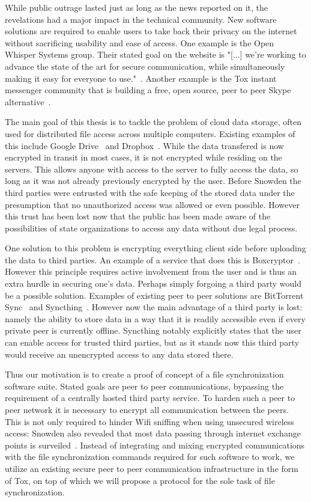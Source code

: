While public outrage lasted just as long as the news reported on it, the revelations had a major impact in the technical community.
New software solutions are required to enable users to take back their privacy on the internet without sacrificing usability and ease of access.
One example is the Open Whisper Systems group.
Their stated goal on the website is "[...] we're working to advance the state of the art for secure communication, while simultaneously making it easy for everyone to use."~\cite{web:site:whispersystems}.
Another example is the Tox instant messenger community that is building a free, open source, peer to peer Skype alternative~\cite{web:site:tox}.

The main goal of this thesis is to tackle the problem of cloud data storage, often used for distributed file access across multiple computers.
Existing examples of this include Google Drive~\cite{web:site:gdrive} and Dropbox~\cite{web:site:dropbox}.
While the data transfered is now encrypted in transit in most cases, it is not encrypted while residing on the servers.
This allows anyone with access to the server to fully access the data, so long as it was not already previously encrypted by the user.
Before Snowden the third parties were entrusted with the safe keeping of the stored data under the presumption that no unauthorized access was allowed or even possible.
However this trust has been lost now that the public has been made aware of the possibilities of state organizations to access any data without due legal process.

One solution to this problem is encrypting everything client side before uploading the data to third parties.
An example of a service that does this is Boxcryptor~\cite{web:site:boxcryptor}.
However this principle requires active involvement from the user and is thus an extra hurdle in securing one's data.
Perhaps simply forgoing a third party would be a possible solution.
Examples of existing peer to peer solutions are BitTorrent Sync~\cite{web:site:bittorrent_sync} and Syncthing~\cite{web:site:synthing}.
However now the main advantage of a third party is lost: namely the ability to store data in a way that it is readily accessible even if every private peer is currently offline.
Syncthing notably explicitly states that the user can enable access for trusted third parties, but as it stands now this third party would receive an unencrypted access to any data stored there.

Thus our motivation is to create a proof of concept of a file synchronization software suite.
Stated goals are peer to peer communications, bypassing the requirement of a centrally hosted third party service.
To harden such a peer to peer network it is necessary to encrypt all communication between the peers.
This is not only required to hinder Wifi sniffing when using unsecured wireless access: Snowden also revealed that most data passing through internet exchange points is surveiled~\cite{web:site:heise:decix}.
Instead of integrating and mixing encrypted communications with the file synchronization commands required for such software to work, we utilize an existing secure peer to peer communication infrastructure in the form of Tox, on top of which we will propose a protocol for the sole task of file synchronization.

